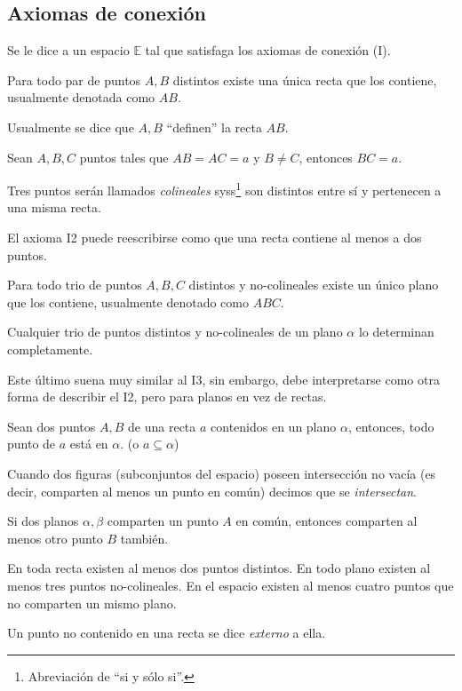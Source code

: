 \documentclass[11pt,a4paper]{book}
\begin{document}
\subsection*{Axiomas de conexión}
\begin{mydef}
Se le dice a un espacio $\mathbb{E}$ tal que satisfaga los axiomas de conexión (I).
\end{mydef}
\begin{axiom}[I, 1]
Para todo par de puntos $A,B$ distintos existe una única recta que los contiene, usualmente denotada como $AB$.
\end{axiom}
Usualmente se dice que $A,B$ ``definen'' la recta $AB$.
\begin{axiom}[I, 2]
Sean $A,B,C$ puntos tales que $AB=AC=a$ y $B\neq C$, entonces $BC=a$.
\end{axiom}
Tres puntos serán llamados \textit{colineales} syss\footnote{Abreviación de ``si y sólo si''.} son distintos entre sí y pertenecen a una misma recta.

El axioma I2 puede reescribirse como que una recta contiene al menos a dos puntos.
\begin{axiom}[I, 3]
Para todo trio de puntos $A,B,C$ distintos y no-colineales existe un único plano que los contiene, usualmente denotado como $ABC$.
\end{axiom}
\begin{axiom}[I, 4]
Cualquier trio de puntos distintos y no-colineales de un plano $\alpha$ lo determinan completamente.
\end{axiom}
Este último suena muy similar al I3, sin embargo, debe interpretarse como otra forma de describir el I2, pero para planos en vez de rectas.
\begin{axiom}[I, 5]
Sean dos puntos $A,B$ de una recta $a$ contenidos en un plano $\alpha$, entonces, todo punto de $a$ está en $\alpha$. (o $a\subseteq\alpha$)
\end{axiom}
Cuando dos figuras (subconjuntos del espacio) poseen intersección no vacía (es decir, comparten al menos un punto en común) decimos que se \textit{intersectan}.
\begin{axiom}[I, 6]
Si dos planos $\alpha,\beta$ comparten un punto $A$ en común, entonces comparten al menos otro punto $B$ también.
\end{axiom}
\begin{axiom}[I, 7]
En toda recta existen al menos dos puntos distintos. En todo plano existen al menos tres puntos no-colineales. En el espacio existen al menos cuatro puntos que no comparten un mismo plano.
\end{axiom}
Un punto no contenido en una recta se dice \textit{externo} a ella.
\end{document}
